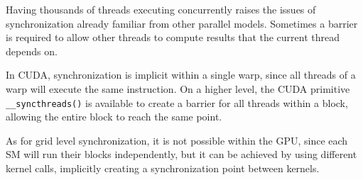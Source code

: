 Having thousands of threads executing concurrently raises the issues of synchronization already familiar from other parallel models. Sometimes a barrier is required to allow other threads to compute results that the current thread depends on.

In CUDA, synchronization is implicit within a single warp, since all threads of a warp will execute the same instruction. On a higher level, the CUDA primitive \texttt{\_\_syncthreads()} is available to create a barrier for all threads within a block, allowing the entire block to reach the same point.

As for grid level synchronization, it is not possible within the GPU, since each SM will run their blocks independently, but it can be achieved by using different kernel calls, implicitly creating a synchronization point between kernels.